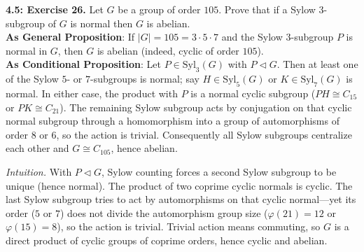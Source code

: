 \documentclass[11pt]{article}
\theoremstyle{definition}
\newcommand{\Syl}{\mathrm{Syl}}
\begin{document}
\noindent \textbf{4.5: Exercise 26.} Let $G$ be a group of order $105$. Prove that if a Sylow $3$-subgroup of $G$ is normal then $G$ is abelian.\\ %

\noindent\textbf{As General Proposition}: If $|G|=105=3\cdot 5\cdot 7$ and the Sylow $3$-subgroup $P$ is normal in $G$, then $G$ is abelian (indeed, cyclic of order $105$).\\

\noindent\textbf{As Conditional Proposition}: Let $P\in \Syl_3(G)$ with $P\lhd G$. Then at least one of the Sylow $5$- or $7$-subgroups is normal; say $H\in \Syl_5(G)$ or $K\in \Syl_7(G)$ is normal. In either case, the product with $P$ is a normal cyclic subgroup ($PH\cong C_{15}$ or $PK\cong C_{21}$). The remaining Sylow subgroup acts by conjugation on that cyclic normal subgroup through a homomorphism into a group of automorphisms of order $8$ or $6$, so the action is trivial. Consequently all Sylow subgroups centralize each other and $G\cong C_{105}$, hence abelian.

\newpage

\dotfill

\emph{Intuition.} With $P\lhd G$, Sylow counting forces a second Sylow subgroup to be unique (hence normal). The product of two coprime cyclic normals is cyclic. The last Sylow subgroup tries to act by automorphisms on that cyclic normal—yet its order ($5$ or $7$) does not divide the automorphism group size ($\varphi(21)=12$ or $\varphi(15)=8$), so the action is trivial. Trivial action means commuting, so $G$ is a direct product of cyclic groups of coprime orders, hence cyclic and abelian.\\

\dotfill
\end{document}
